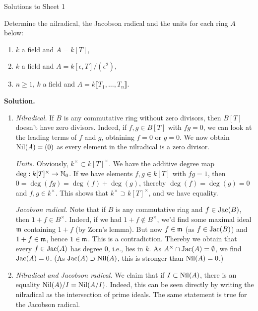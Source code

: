 \documentclass[a4paper,11pt]{article}
\begin{document}
\begin{center}
    \huge{Solutions to Sheet 1}
\end{center}

Determine the nilradical, the Jacobson radical and the units for each
ring $A$ below:
\begin{enumerate}
    \item $k$ a field and $A = k[T]$,
    \item $k$ a field and $A = k[\epsilon, T]/(\epsilon^2)$,
    \item $n \geq 1$, $k$ a field and $A = k \llbracket T_1, \dots, T_n \rrbracket$. 
\end{enumerate}
\textbf{Solution.}
\begin{enumerate}
    \item \textit{Nilradical.} If $B$ is any commutative ring without
        zero divisors, then $B[T]$ doesn't have zero divisors. Indeed,
        if $f, g \in B[T]$ with $fg = 0$, we can look at the leading terms
        of $f$ and $g$, obtaining $f = 0$ or $g = 0$. We now obtain $\operatorname{Nil}(A) = (0)$
        as every element in the nilradical is a zero divisor.

        \textit{Units.} Obviously, $k^\times \subset k[T]^\times$.
        We have the additive degree map $\deg: k[T]^\times \to \mathbb{N}_0$. If
        we have elements $f,g \in k[T]$ with $fg = 1$,
        then $0 = \deg (fg) = \deg(f) + \deg(g)$, thereby $\deg(f) = \deg(g) = 0$
        and $f,g \in k^\times$. This shows that $k^\times \supset k[T]^\times$,
        and we have equality. 

        \textit{Jacobson radical.} Note that if $B$ is any commutative 
        ring and $f \in \operatorname{Jac}(B)$, then $1 + f \in B^\times$. Indeed, if we had
        $1 + f \not \in B^\times$, we'd find some maximal ideal $\mathfrak{m}$ containing
        $1 + f$ (by Zorn's lemma). But now $f \in \mathfrak{m}$ (as $f \in \operatorname{Jac}(B)$)
        and $1 + f \in \mathfrak{m}$, hence $1 \in \mathfrak{m}$. This is a contradiction. 
        Thereby we obtain
        that every $f \in \operatorname{Jac}(A)$ has degree $0$, i.e., lies in $k$. As
        $A^\times \cap \operatorname{Jac}(A) = \emptyset$, we find $\operatorname{Jac}(A) = 0$. (As
        $\operatorname{Jac}(A) \supset \operatorname{Nil}(A)$, this is stronger than $\operatorname{Nil}(A) = 0$.) 
    \item \textit{Nilradical and Jacobson radical.} We claim that if $I \subset
        \operatorname{Nil}(A)$, there is an equality $\operatorname{Nil}(A)/I = \operatorname{Nil}(A/I)$. Indeed, this
        can be seen directly by writing the nilradical as the intersection of
        prime ideals. The same statement is true for the Jacobson radical. 


\end{enumerate}
\end{document}
